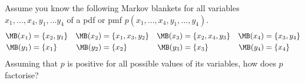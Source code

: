 
\label{ex:factorisation-from-the-Markov-blankets-I}

Assume you know the following Markov blankets for all variables $x_1,
\ldots, x_4, y_1, \ldots y_4$ of a pdf or pmf $p(x_1, \ldots, x_4,
y_1, \ldots,y_4)$.
\begin{align}
  \MB(x_1) &= \{x_2, y_1\} & \MB(x_2)&=\{x_1, x_3, y_2\} & \MB(x_3)&=\{x_2, x_4, y_3\} & \MB(x_4)&=\{x_3, y_4\}\\
  \MB(y_1) &= \{x_1\}      & \MB(y_2)&= \{x_2\}         &  \MB(y_3)&= \{x_3\}         &  \MB(y_4) &= \{x_4\}
\end{align}
Assuming that $p$ is positive for all possible
values of its variables, how does $p$ factorise?

